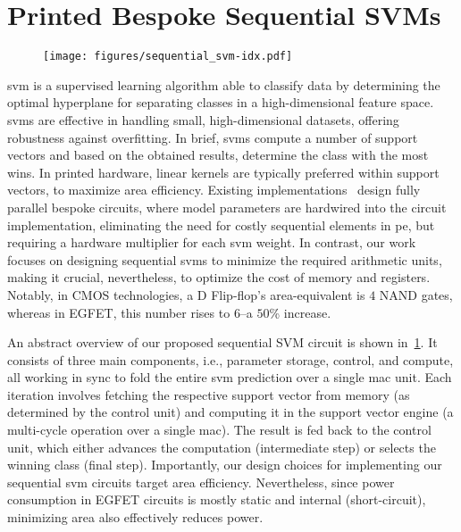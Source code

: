 \section{Printed Bespoke Sequential SVMs}
\label{sec:svm}
\begin{figure}[!t]
    \centering
    \texttt{[image: figures/sequential\_svm-idx.pdf]} \vspace{-4ex}
    \caption{}
    \label{fig:architecture}\vspace{-3ex}
\end{figure}

\gls{svm} is a supervised learning algorithm able to classify data by determining the optimal hyperplane for separating classes in a high-dimensional feature space.
\glspl{svm} are effective in handling small, high-dimensional datasets, offering robustness against overfitting.
In brief, \glspl{svm} compute a number of support vectors
and based on the obtained results, determine the class with the most wins.
In printed hardware, linear kernels are typically preferred within support vectors, to maximize area efficiency.
Existing implementations~\cite{Mubarik:MICRO:2020:printedml, Armeniakos:TCAD2023:cross} design fully parallel bespoke circuits, where model parameters are hardwired into the circuit implementation, eliminating the need for costly sequential elements in \gls{pe}, but requiring a hardware multiplier for each \gls{svm} weight.
In contrast, our work focuses on designing sequential \glspl{svm} to minimize the required arithmetic units, making it crucial, nevertheless, to optimize the cost of memory and registers.
Notably, in CMOS technologies, a D Flip-flop's area-equivalent is $4$ NAND gates, whereas in EGFET, this number rises to $6$--a $50$\% increase.

An abstract overview of our proposed sequential SVM circuit is shown in~\cref{fig:architecture}.
It consists of three main components, i.e., parameter storage, control, and compute, all working in sync to fold the entire \gls{svm} prediction over a single \gls{mac} unit. 
Each iteration involves fetching the respective support vector from memory (as determined by the control unit) and computing it in the support vector engine (a multi-cycle operation over a single \gls{mac}).
The result is fed back to the control unit, which either advances the computation (intermediate step) or selects the winning class (final step).
Importantly, our design choices for implementing our sequential \gls{svm} circuits target area efficiency.
Nevertheless, since power consumption in EGFET circuits is mostly static and internal (short-circuit), minimizing area also effectively reduces power.

